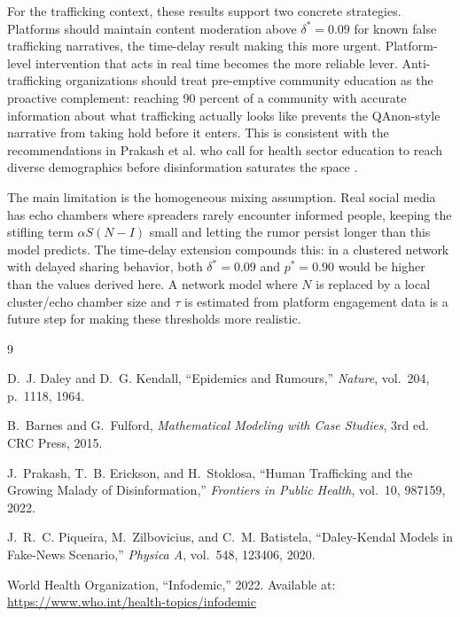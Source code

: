 \documentclass[12pt]{article}
\begin{document}
For the trafficking context, these results support two concrete strategies.
Platforms should maintain content moderation above $\delta^* = 0.09$ for
known false trafficking narratives, the time-delay result making this
more urgent.
Platform-level intervention that acts in real time becomes the more reliable
lever. Anti-trafficking organizations should treat pre-emptive community
education as the proactive complement: reaching 90 percent of a community
with accurate information about what trafficking actually looks like prevents the QAnon-style narrative from taking hold before
it enters. This is consistent with the recommendations in Prakash et al. who call for health sector education to reach diverse demographics
before disinformation saturates the space \cite{prakash2022}.

The main limitation is the homogeneous mixing assumption. Real social media
has echo chambers where spreaders rarely encounter informed people, keeping
the stifling term $\alpha S(N - I)$ small and letting the rumor persist
longer than this model predicts. The time-delay extension compounds this:
in a clustered network with delayed sharing behavior, both $\delta^* = 0.09$
and $p^* = 0.90$ would be higher than the values derived here. A network
model where $N$ is replaced by a local cluster/echo chamber size and $\tau$ is
estimated from platform engagement data is a future step for making
these thresholds more realistic.

\begin{thebibliography}{9}

D.~J. Daley and D.~G. Kendall,
``Epidemics and Rumours,''
\textit{Nature}, vol.~204, p.~1118, 1964.

B.~Barnes and G.~Fulford,
\textit{Mathematical Modeling with Case Studies}, 3rd ed.
CRC Press, 2015.

J.~Prakash, T.~B. Erickson, and H.~Stoklosa,
``Human Trafficking and the Growing Malady of Disinformation,''
\textit{Frontiers in Public Health}, vol.~10, 987159, 2022.

J.~R.~C. Piqueira, M.~Zilbovicius, and C.~M. Batistela,
``Daley-Kendal Models in Fake-News Scenario,''
\textit{Physica A}, vol.~548, 123406, 2020.

World Health Organization,
``Infodemic,'' 2022.
Available at: \url{https://www.who.int/health-topics/infodemic}

\end{thebibliography}
\end{document}
